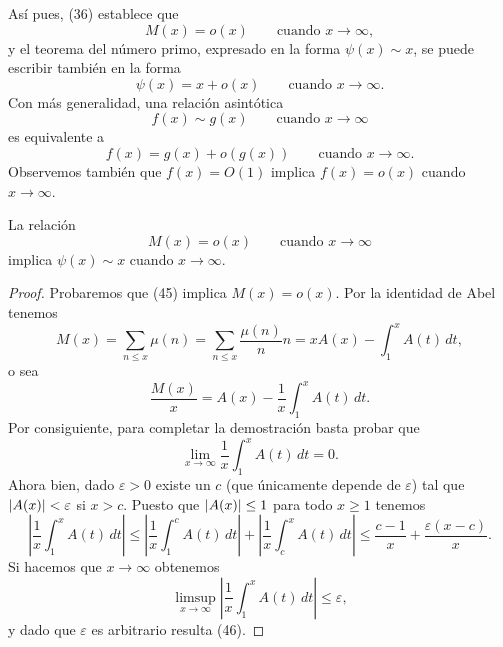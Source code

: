 \documentclass[12pt,a4paper]{book}
\begin{document}
    Así pues, (36) establece que
    \begin{equation*}
        M(x)=o(x)\qquad\text{cuando } x\to\infty,
    \end{equation*}
    y el teorema del número primo, expresado en la forma $\psi(x)\sim x$, se puede
    escribir también en la forma
    \begin{equation*}
        \psi(x)=x+o(x)\qquad\text{cuando } x\to\infty.
    \end{equation*}
    Con más generalidad, una relación asintótica
    \begin{equation*}
        f(x)\sim g(x)\qquad\text{cuando } x\to\infty
    \end{equation*}
    es equivalente a
    \begin{equation*}
        f(x)=g(x)+o(g(x))\qquad\text{cuando } x\to\infty.
    \end{equation*}
    Observemos también que $f(x)=O(1)$ implica $f(x)=o(x)$ cuando $x\to\infty$.

    \begin{teorema}
        La relación
        \begin{equation}
            M(x)=o(x)\qquad\text{cuando } x\to\infty
        \end{equation}
        implica $\psi(x)\sim x$ cuando $x\to\infty$.
    \end{teorema}

    \begin{proof}
        Probaremos que (45) implica $M(x)=o(x)$. Por la identidad de Abel tenemos
        \begin{equation*}
            M(x)=\sum_{n\leq x}\mu(n)=\sum_{n\leq x}\frac{\mu(n)}{n}n=xA(x)-\int_1^x A(t)\,dt,
        \end{equation*}
        o sea
        \begin{equation*}
            \frac{M(x)}{x}=A(x)-\frac{1}{x}\int_1^x A(t)\,dt.
        \end{equation*}
        Por consiguiente, para completar la demostración basta probar que
        \begin{equation}
            \lim_{x\to\infty}\frac{1}{x}\int_1^x A(t)\,dt=0.
        \end{equation}
        Ahora bien, dado $\varepsilon>0$ existe un $c$ (que únicamente depende de
        $\varepsilon$) tal que $\abs{A(x)}<\varepsilon$ si $x>c$. Puesto que
        $\abs{A(x)}\leq1$ para todo $x\geq1$ tenemos
        \begin{equation*}
            \left|\frac{1}{x}\int_1^x A(t)\,dt\right|\leq\left|\frac{1}{x}\int_1^c A(t)\,dt\right|
            +\left|\frac{1}{x}\int_c^x A(t)\,dt\right|\leq\frac{c-1}{x}+\frac{\varepsilon(x-c)}{x}.
        \end{equation*}
        Si hacemos que $x\to\infty$ obtenemos
        \begin{equation*}
            \limsup_{x\to\infty}\left|\frac{1}{x}\int_1^x A(t)\,dt\right|\leq\varepsilon,
        \end{equation*}
        y dado que $\varepsilon$ es arbitrario resulta (46).
    \end{proof}
\end{document}
